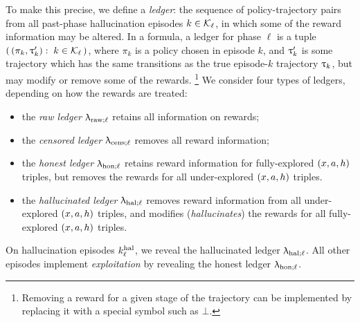 To make this precise, we define a \emph{ledger}: the sequence of policy-trajectory pairs from all past-phase hallucination episodes $k\in \mathcal{K}_{\ell}$, in which some of the reward information may be altered. In a formula, a ledger for phase $\ell$ is a tuple
    $ \left(\, (\pi_k,{\uptau}'_k):\; k\in \mathcal{K}_{\ell}\,\right) $,
where $\pi_k$ is a policy chosen in episode $k$, and ${\uptau}'_k$ is some trajectory which has the same transitions as the true episode-$k$ trajectory ${\uptau}_k$, but may modify or remove some of the rewards.%
\footnote{Removing a reward for a given stage of the trajectory can be implemented by replacing it with a special symbol such as $\bot$.}
We consider four types of ledgers, depending on how the rewards are treated:
\begin{itemize}
\item the \emph{raw ledger} $\uplambda_{\mathrm{raw};\ell}$ retains all information on rewards;
\item the \emph{censored ledger} $\uplambda_{\mathrm{cens};\ell}$ removes all reward information;
\item the \emph{honest ledger} $\uplambda_{\mathrm{hon};\ell}$
 retains reward information for fully-explored $(x,a,h)$ triples,
 but removes the rewards for all under-explored $(x,a,h)$ triples.
\item the \emph{hallucinated ledger} $\uplambda_{\mathrm{hal};\ell}$
     removes reward information from all under-explored $(x,a,h)$ triples,
    and modifies (\emph{hallucinates}) the rewards for all fully-explored $(x,a,h)$ triples.
\end{itemize}



\noindent On hallucination episodes $k^{\mathrm{hal}}_{\ell}$, we reveal the hallucinated ledger $\uplambda_{\mathrm{hal};\ell}$. All other episodes implement \emph{exploitation} by revealing the honest ledger $\uplambda_{\mathrm{hon};\ell}$. \begin{comment}{Again, formal definitions are deferred to \Cref{app:detailed-spec}.}\end{comment}

